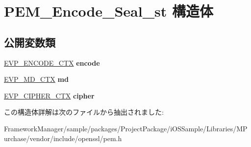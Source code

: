 \hypertarget{struct_p_e_m___encode___seal__st}{}\section{P\+E\+M\+\_\+\+Encode\+\_\+\+Seal\+\_\+st 構造体}
\label{struct_p_e_m___encode___seal__st}
\subsection*{公開変数類}
\begin{DoxyCompactItemize}
\item 
\hypertarget{struct_p_e_m___encode___seal__st_a47cfc43decced4ead8d4939f37ff5d32}{}\hyperlink{structevp___encode___ctx__st}{E\+V\+P\+\_\+\+E\+N\+C\+O\+D\+E\+\_\+\+C\+T\+X} {\bfseries encode}\label{struct_p_e_m___encode___seal__st_a47cfc43decced4ead8d4939f37ff5d32}

\item 
\hypertarget{struct_p_e_m___encode___seal__st_abdc58bdc153bb43dcf29e7a6a339f8bd}{}\hyperlink{structenv__md__ctx__st}{E\+V\+P\+\_\+\+M\+D\+\_\+\+C\+T\+X} {\bfseries md}\label{struct_p_e_m___encode___seal__st_abdc58bdc153bb43dcf29e7a6a339f8bd}

\item 
\hypertarget{struct_p_e_m___encode___seal__st_a5a3c09ebd5be8036df38f8f623f5ef79}{}\hyperlink{structevp__cipher__ctx__st}{E\+V\+P\+\_\+\+C\+I\+P\+H\+E\+R\+\_\+\+C\+T\+X} {\bfseries cipher}\label{struct_p_e_m___encode___seal__st_a5a3c09ebd5be8036df38f8f623f5ef79}

\end{DoxyCompactItemize}


この構造体詳解は次のファイルから抽出されました\+:\begin{DoxyCompactItemize}
\item 
Framework\+Manager/sample/packages/\+Project\+Package/i\+O\+S\+Sample/\+Libraries/\+M\+Purchase/vendor/include/openssl/pem.\+h\end{DoxyCompactItemize}

